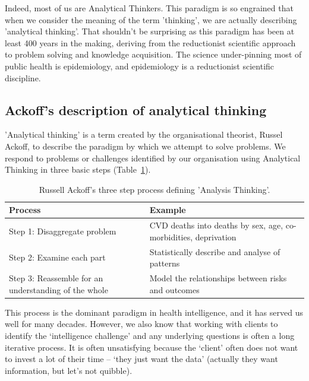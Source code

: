 Indeed, most of us are Analytical Thinkers. This paradigm is so engrained that when we consider the meaning of the term 'thinking', we are actually describing 'analytical thinking'. That shouldn't be surprising as this paradigm has been at least 400 years in the making, deriving from  the reductionist scientific approach to problem solving and knowledge acquisition. The science under-pinning most of public health is epidemiology, and epidemiology is a reductionist scientific discipline.

\subsection{Ackoff's description of analytical thinking}
'Analytical thinking' is a term created by the organisational theorist, Russel Ackoff, to describe the paradigm by which we attempt to solve problems. We respond to problems or challenges identified by our organisation using Analytical Thinking in three basic steps (Table~\ref{tab:analysisthinking}).

\begin{table}[h]
	\begin{center}
		\footnotesize%
		\begin{tabular}{p{4cm} p{6cm}}
			\toprule
			Process & Example  \\
			\midrule
			Step 1: Disaggregate problem & CVD deaths into deaths by sex, age, co-morbidities, deprivation\\
			Step 2: Examine each part & Statistically describe and analyse of patterns\\
			Step 3: Reassemble for an understanding of the whole & Model the relationships between risks and outcomes\\
			\bottomrule
		\end{tabular}
	\end{center}
	\caption{Russell Ackoff's three step process defining 'Analysis Thinking'.}
	\label{tab:analysisthinking}
\end{table}

This process is the dominant paradigm in health intelligence, and it has served us well for many decades\cite[-1\baselineskip]{RegmiandGee2016}. However, we also know that working with clients to identify the ‘intelligence challenge’ and any underlying questions is often a long iterative process. It is often unsatisfying because the ‘client’ often does not want to invest a lot of their time – ‘they just want the data’ (actually they want information, but let's not quibble).

